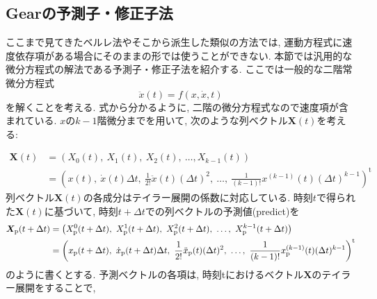 \subsection{Gearの予測子・修正子法}

ここまで見てきたベルレ法やそこから派生した類似の方法では, 運動方程式に速度依存項がある場合にそのままの形では使うことができない.
本節では汎用的な微分方程式の解法である予測子・修正子法を紹介する\cite{2003Nose}.
ここでは一般的な二階常微分方程式
\begin{equation}
  \ddot{x}(t) = f(x, \dot{x}, t)
\end{equation}
を解くことを考える. 式から分かるように, 二階の微分方程式なので速度項が含まれている.
$x$の$k-1$階微分までを用いて, 次のような列ベクトル$\bm{X}(t)$を考える:

\begin{align}
  \bm{X}(t)
  &=
  \left(
    X_{0}(t),~ X_{1}(t),~ X_{2}(t), ~\ldots, X_{k-1}(t)
  \right)
  \\
  &=
  \left(
    x(t),~
    \dot{x}(t) \Delta t,~
    \frac{1}{2!} \ddot{x}(t) (\Delta t)^{2}
    ,~\ldots,~
    \frac{1}{(k-1)!}x^{(k-1)}(t) (\Delta t)^{k-1}
  \right)^{\mathrm{t}}
\end{align}
列ベクトル$\bm{X}(t)$の各成分はテイラー展開の係数に対応している.
時刻$t$で得られた$\bm{X}(t)$に基づいて, 時刻$t + \Delta t$での列ベクトルの予測値(predict)を
\begin{align}
  \bm{X}_{\mathrm{p}}(t + \Delta t)
  &=
  \left(
    X_{\mathrm{p}}^{0} (t + \Delta t),~
    X_{\mathrm{p}}^{1} (t + \Delta t),~
    X_{\mathrm{p}}^{2} (t + \Delta t),~
    \ldots,~
    X_{\mathrm{p}}^{k-1} (t + \Delta t)
  \right)
  \notag \\
  &=
  \left(
    x_{\mathrm{p}}(t + \Delta t),~
    \dot{x}_{\mathrm{p}} (t + \Delta t) \Delta t,~
    \frac{1}{2!} \ddot{x}_{\mathrm{p}}(t) (\Delta t)^{2}
    ,~\ldots,~
    \frac{1}{(k-1)!}x^{(k-1)}_{\mathrm{p}}(t) (\Delta t)^{k-1}
  \right)^{\mathrm{t}}
\end{align}
のように書くとする. 予測ベクトルの各項は, 時刻tにおけるベクトル$\bm{X}$のテイラー展開をすることで,

